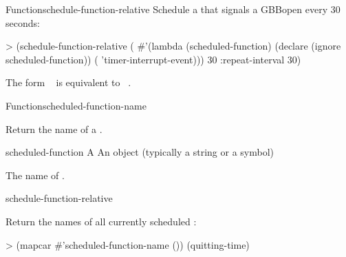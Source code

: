 \begin{functiondoc}{Function}{schedule-function-relative}
%
%
Schedule a  that signals a GBBopen
 every 30 seconds:
\begin{example}
> (schedule-function-relative
    (
      #'(lambda (scheduled-function)
          (declare (ignore scheduled-function))
          ( 'timer-interrupt-event)))
    30
    :repeat-interval 30)
\end{example}

\fnnote The form \mbox{
   } is equivalent to
\mbox{ 
}.

\end{functiondoc}


\begin{functiondoc}{Function}{scheduled-function-name}%
  {}
%
%

\fnsyntax

\fnpurpose Return the name of a .

\fnsetf
{}%
  {}{}

\fnpackage {}

\fnmodule {}

\fnargs
\begin{args}{scheduled-function}
 A 
\arg[name] An object (typically a string or a symbol)
\end{args}

\fnreturns The name of . 

\begin{alsos}{schedule-function-relative}
\end{alsos}

%
\fnexample
Return the names of all currently scheduled :
\begin{example}
> (mapcar #'scheduled-function-name ())
(quitting-time)
\end{example}

\end{functiondoc}

